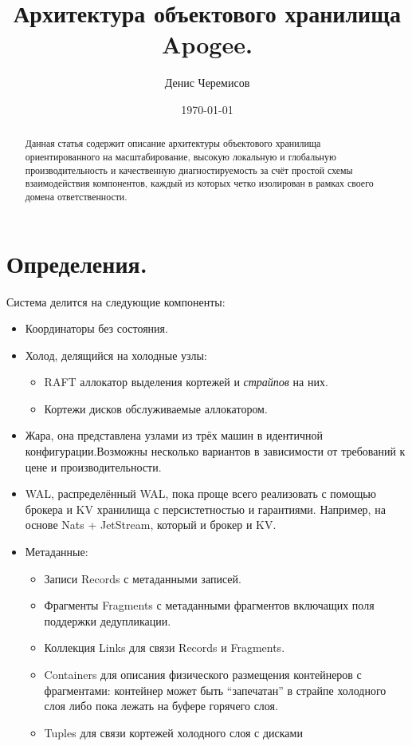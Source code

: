 \documentclass[a4paper,12pt]{article}
\title{Архитектура объектового хранилища Apogee.}
\author{Денис Черемисов}
\date{\today}
\begin{document}
\maketitle

\begin{abstract}
Данная статья содержит описание архитектуры объектового хранилища ориентированного на масштабирование, высокую локальную и глобальную производительность и качественную диагностируемость
за счёт простой схемы взаимодействия компонентов, каждый из которых четко изолирован в рамках своего домена ответственности.
\end{abstract}

\newpage
\tableofcontents
\newpage  %

\section{Определения.}

Система делится на следующие компоненты:

\begin{itemize}
\item Координаторы без состояния.

\item Холод, делящийся на холодные узлы:
    \begin{itemize}
    \item RAFT аллокатор выделения кортежей и \textit{страйпов} на них.
    \item Кортежи дисков обслуживаемые аллокатором.
    \end{itemize}

\item Жара, она представлена узлами из трёх машин в идентичной конфигурации.Возможны несколько вариантов в зависимости от требований к цене и производительности.

\item WAL, распределённый WAL, пока проще всего реализовать с помощью брокера и KV хранилища с персистетностью и гарантиями. Например, на основе Nats + JetStream, который и брокер и KV.

\item Метаданные:
    \begin{itemize}
    \item Записи Records с метаданными записей.
    \item Фрагменты Fragments с метаданными фрагментов включащих поля поддержки дедупликации.
    \item Коллекция Links для связи Records и Fragments.
    \item Containers для описания физического размещения контейнеров с фрагментами: контейнер может быть \enquote{запечатан} в страйпе холодного слоя либо пока лежать на буфере горячего слоя.
    \item Tuples для связи кортежей холодного слоя с дисками
    \end{itemize}
\end{itemize}
\end{document}
